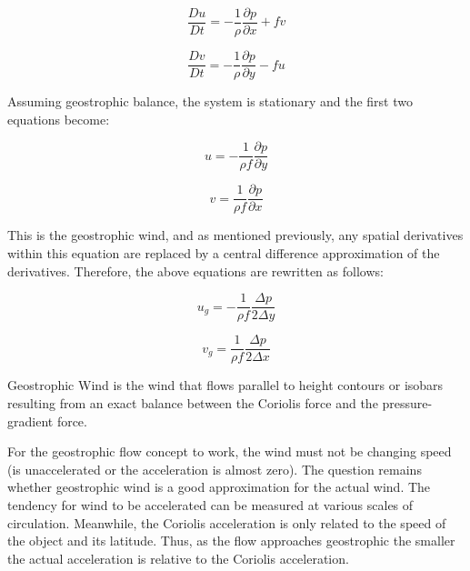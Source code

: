 \begin{equation}
    \frac{Du}{Dt} = -\frac{1}{\rho}\frac{\partial p}{\partial x} + f v
\end{equation}

\begin{equation}
    \frac{Dv}{Dt} = -\frac{1}{\rho}\frac{\partial p}{\partial y} - f  u
\end{equation}

Assuming geostrophic balance, the system is stationary and the first two equations become:  

\begin{equation}
    u = -\frac{1}{\rho f} \frac{\partial p}{\partial y}
\end{equation}

\begin{equation}
    v = \frac{1}{\rho f} \frac{\partial p}{\partial x}
\end{equation}

This is the geostrophic wind, and as mentioned previously, any spatial derivatives within this equation are replaced by a central difference approximation of the derivatives. Therefore, the above equations are rewritten as follows:

\begin{equation}
    u_g = -\frac{1}{\rho f} \frac{\Delta p}{2 \Delta y}
\end{equation}

\begin{equation}
    v_g = \frac{1}{\rho f} \frac{\Delta p}{2 \Delta x}
\end{equation}

\begin{definition}
Geostrophic Wind is the wind that flows parallel to height contours or isobars resulting from an exact balance between the Coriolis force and the pressure-gradient force.
\end{definition}

For the geostrophic flow concept to work, the wind must not be changing speed (is unaccelerated or the acceleration is almost zero). The question remains whether geostrophic wind is a good approximation for the actual wind. The tendency for wind to be accelerated can be measured at various scales of circulation. Meanwhile, the Coriolis acceleration is only related to the speed of the object and its latitude. Thus, as the flow  approaches geostrophic the smaller the actual acceleration is relative to the Coriolis acceleration\cite{geo_wind}.


